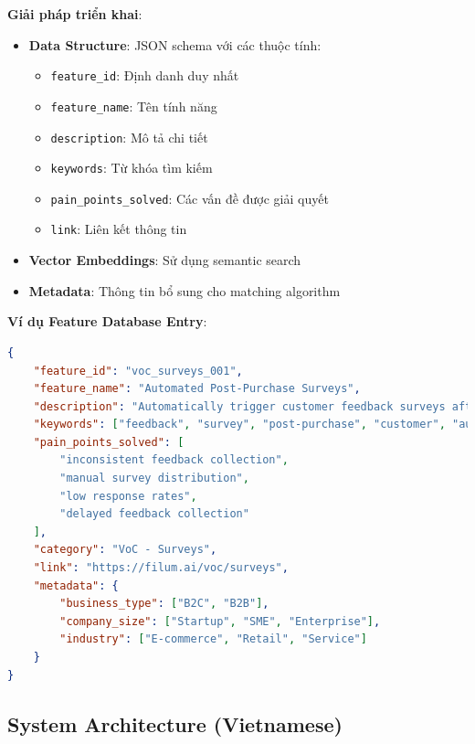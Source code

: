 \documentclass[12pt,a4paper]{article}
\begin{document}
\textbf{Giải pháp triển khai}:
\begin{itemize}
    \item \textbf{Data Structure}: JSON schema với các thuộc tính:
    \begin{itemize}
        \item \texttt{feature\_id}: Định danh duy nhất
        \item \texttt{feature\_name}: Tên tính năng
        \item \texttt{description}: Mô tả chi tiết
        \item \texttt{keywords}: Từ khóa tìm kiếm
        \item \texttt{pain\_points\_solved}: Các vấn đề được giải quyết
        \item \texttt{link}: Liên kết thông tin
    \end{itemize}
    \item \textbf{Vector Embeddings}: Sử dụng semantic search
    \item \textbf{Metadata}: Thông tin bổ sung cho matching algorithm
\end{itemize}

\textbf{Ví dụ Feature Database Entry}:
\begin{lstlisting}[language=json, caption=Ví dụ Feature Database Schema]
{
    "feature_id": "voc_surveys_001",
    "feature_name": "Automated Post-Purchase Surveys",
    "description": "Automatically trigger customer feedback surveys after purchase transactions via email, SMS, or in-app notifications",
    "keywords": ["feedback", "survey", "post-purchase", "customer", "automation", "email", "sms"],
    "pain_points_solved": [
        "inconsistent feedback collection",
        "manual survey distribution",
        "low response rates",
        "delayed feedback collection"
    ],
    "category": "VoC - Surveys",
    "link": "https://filum.ai/voc/surveys",
    "metadata": {
        "business_type": ["B2C", "B2B"],
        "company_size": ["Startup", "SME", "Enterprise"],
        "industry": ["E-commerce", "Retail", "Service"]
    }
}
\end{lstlisting}

\subsection{System Architecture (Vietnamese)}
\end{document}

